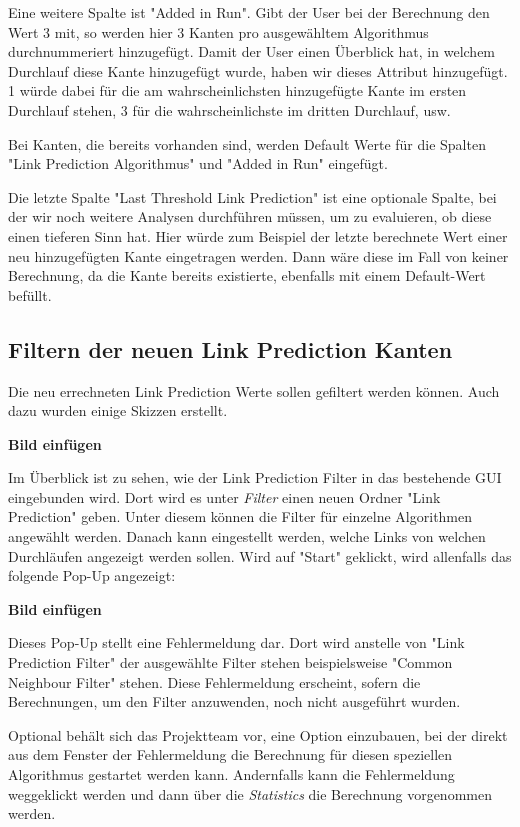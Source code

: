 Eine weitere Spalte ist "Added in Run". Gibt der User bei der Berechnung den Wert 3 mit, so werden hier 3 Kanten pro
ausgewähltem Algorithmus durchnummeriert hinzugefügt. Damit der User einen Überblick hat, in welchem Durchlauf diese
Kante hinzugefügt wurde, haben wir dieses Attribut hinzugefügt. 1 würde dabei für die am wahrscheinlichsten hinzugefügte
Kante im ersten Durchlauf stehen, 3 für die wahrscheinlichste im dritten Durchlauf, usw.

Bei Kanten, die bereits vorhanden sind, werden Default Werte für die Spalten "Link Prediction Algorithmus" und "Added
in Run" eingefügt.

Die letzte Spalte "Last Threshold Link Prediction" ist eine optionale Spalte, bei der wir noch weitere Analysen
durchführen müssen, um zu evaluieren, ob diese einen tieferen Sinn hat. Hier würde zum Beispiel der letzte berechnete
Wert einer neu hinzugefügten Kante eingetragen werden. Dann wäre diese im Fall von keiner Berechnung, da die Kante
bereits existierte, ebenfalls mit einem Default-Wert befüllt.

\subsection{Filtern der neuen Link Prediction Kanten}

Die neu errechneten Link Prediction Werte sollen gefiltert werden können. Auch dazu wurden einige Skizzen erstellt.

\textbf{Bild einfügen}

Im Überblick ist zu sehen, wie der Link Prediction Filter in das bestehende GUI eingebunden wird. Dort wird es unter
\textit{Filter} einen neuen Ordner "Link Prediction" geben. Unter diesem können die Filter für einzelne Algorithmen
angewählt werden. Danach kann eingestellt werden, welche Links von welchen Durchläufen angezeigt werden sollen. Wird auf
"Start" geklickt, wird allenfalls das folgende Pop-Up angezeigt:

\textbf{Bild einfügen}

Dieses Pop-Up stellt eine Fehlermeldung dar. Dort wird anstelle von "Link Prediction Filter" der ausgewählte Filter
stehen beispielsweise "Common Neighbour Filter" stehen. Diese Fehlermeldung erscheint, sofern die Berechnungen, um den
Filter anzuwenden, noch nicht ausgeführt wurden.

Optional behält sich das Projektteam vor, eine Option einzubauen, bei der direkt aus dem Fenster der Fehlermeldung die
Berechnung für diesen speziellen Algorithmus gestartet werden kann. Andernfalls kann die Fehlermeldung weggeklickt
werden und dann über die \textit{Statistics} die Berechnung vorgenommen werden.

